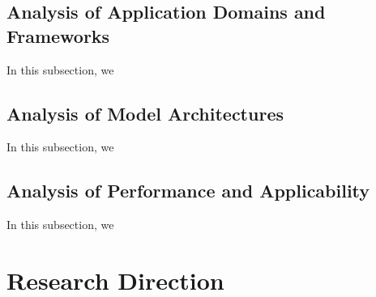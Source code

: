 \documentclass[conference]{IEEEtran}
\begin{document}
\subsection{Analysis of Application Domains and Frameworks}
In this subsection, we 

\subsection{Analysis of Model Architectures}
In this subsection, we 

\subsection{Analysis of Performance and Applicability}
In this subsection, we 

\section{Research Direction}
\end{document}
